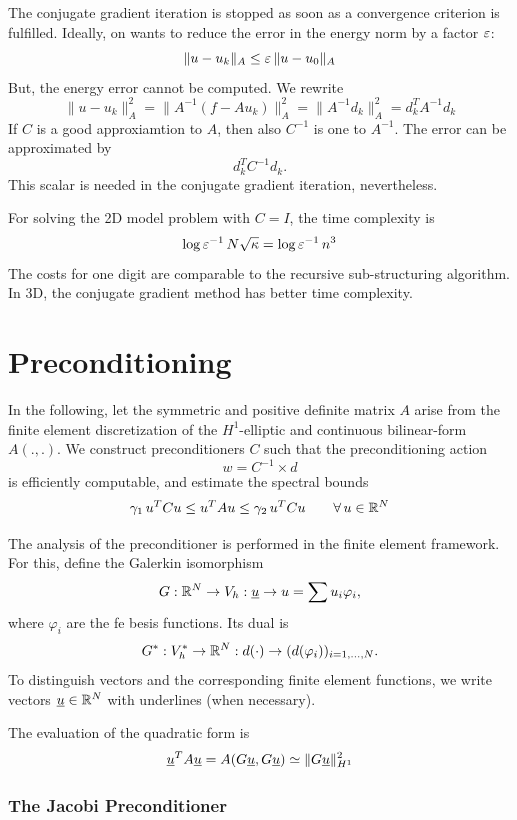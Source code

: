 \bigskip

The conjugate gradient iteration is stopped as soon as a convergence 
criterion is fulfilled. Ideally, on wants to reduce the error in the energy
norm by a factor $\varepsilon$:
$$
\| u - u_k \|_A \leq \varepsilon \, \| u - u_0 \|_A
$$
But, the energy error cannot be computed. We rewrite
$$
\| u - u_k \|_A^2 = \| A^{-1} (f - A u_k) \|_A^2 = \| A^{-1} d_k \|_A^2
= d_k^T A^{-1} d_k
$$
If $C$ is a good approxiamtion to $A$, then also $C^{-1}$ is one to $A^{-1}$. 
The error can be approximated by 
$$
d_k^T C^{-1} d_k.
$$
This scalar is needed in the conjugate gradient iteration, nevertheless.

\bigskip

For solving the 2D model problem with $C = I$, the time complexity is
$$
\log \varepsilon^{-1} \, N \sqrt{\kappa} = \log \varepsilon^{-1} \, n^3
$$
The costs for one digit are comparable to the recursive sub-structuring algorithm. In 3D, the conjugate gradient method has better time complexity. 


\section{Preconditioning}

In the following, let the symmetric and positive definite matrix
$A$ arise from the finite element discretization of the $H^1$-elliptic 
and continuous bilinear-form $A(.,.)$.
We construct preconditioners $C$ such that the preconditioning action
$$
w = C^{-1} \times d
$$
is efficiently computable, and estimate the spectral bounds
$$
\gamma_1 \, u^T C u \leq u^T A u \leq \gamma_2 \, u^T C u \qquad
\forall \, u \in {\mathbb R}^N
$$


The analysis of the preconditioner is performed in the finite element
framework. For this, define the Galerkin isomorphism
$$
G : {\mathbb R}^N \rightarrow V_h : \underline u \rightarrow u = \sum u_i \varphi_i,
$$
where $\varphi_i$ are the fe besis functions. Its dual is 
$$
G^\ast : V_h^\ast \rightarrow {\mathbb R}^N : d(\cdot) \rightarrow (d(\varphi_i))_{i=1,\ldots, N}.
$$
To distinguish vectors and the  corresponding finite element functions,
we write vectors $\underline u \in {\mathbb R}^N$ with underlines (when necessary).

The evaluation of the quadratic form is
$$
\underline u^T A \underline u = A(G \underline u, G \underline u) \simeq \| G \underline u \|_{H^1}^2
$$

\subsubsection{The Jacobi Preconditioner}

